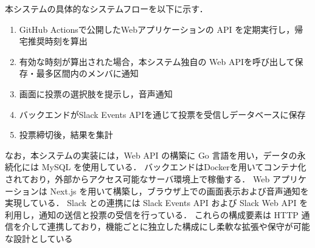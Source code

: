 本システムの具体的なシステムフローを以下に示す．
\begin{enumerate}[label=\textcircled{\scriptsize\arabic*}]
  \item GitHub Actionsで公開したWebアプリケーションの API を定期実行し，帰宅推奨時刻を算出
  \item 有効な時刻が算出された場合，本システム独自の Web APIを呼び出して保存・最多区間内のメンバに通知
  \item 画面に投票の選択肢を提示し，音声通知
  \item バックエンドがSlack Events APIを通じて投票を受信しデータベースに保存
  \item 投票締切後，結果を集計
\end{enumerate}


なお，本システムの実装には，Web API の構築に Go 言語を用い，データの永続化には MySQL を使用している．
バックエンドはDockerを用いてコンテナ化されており，外部からアクセス可能なサーバ環境上で稼働する．
Web アプリケーションは Next.js を用いて構築し，ブラウザ上での画面表示および音声通知を実現している．
Slack との連携には Slack Events API および Slack Web API を利用し，通知の送信と投票の受信を行っている．
これらの構成要素は HTTP 通信を介して連携しており，機能ごとに独立した構成にし柔軟な拡張や保守が可能な設計としている
